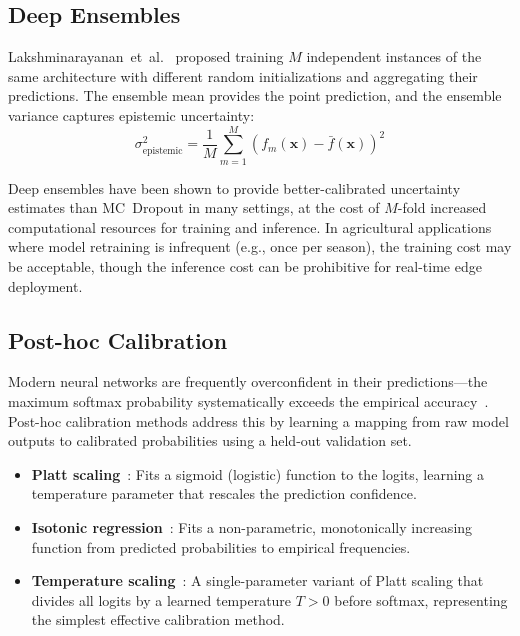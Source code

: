 \documentclass[journal]{IEEEtran}
\begin{document}
\subsection{Deep Ensembles}

Lakshminarayanan~et~al.~\cite{lakshminarayanan2017simple} proposed training $M$ independent instances of the same architecture with different random initializations and aggregating their predictions. The ensemble mean provides the point prediction, and the ensemble variance captures epistemic uncertainty:
\begin{equation}
  \sigma^2_{\text{epistemic}} = \frac{1}{M} \sum_{m=1}^{M} (f_m(\mathbf{x}) - \bar{f}(\mathbf{x}))^2
\end{equation}

Deep ensembles have been shown to provide better-calibrated uncertainty estimates than MC~Dropout in many settings, at the cost of $M$-fold increased computational resources for training and inference. In agricultural applications where model retraining is infrequent (e.g., once per season), the training cost may be acceptable, though the inference cost can be prohibitive for real-time edge deployment.

\subsection{Post-hoc Calibration}

Modern neural networks are frequently overconfident in their predictions---the maximum softmax probability systematically exceeds the empirical accuracy~\cite{guo2017calibration}. Post-hoc calibration methods address this by learning a mapping from raw model outputs to calibrated probabilities using a held-out validation set.

\begin{itemize}[leftmargin=*]
  \item \textbf{Platt scaling}~\cite{platt1999probabilistic}: Fits a sigmoid (logistic) function to the logits, learning a temperature parameter that rescales the prediction confidence.
  
  \item \textbf{Isotonic regression}~\cite{zadrozny2002transforming}: Fits a non-parametric, monotonically increasing function from predicted probabilities to empirical frequencies.
  
  \item \textbf{Temperature scaling}~\cite{guo2017calibration}: A single-parameter variant of Platt scaling that divides all logits by a learned temperature $T > 0$ before softmax, representing the simplest effective calibration method.
\end{itemize}
\end{document}
